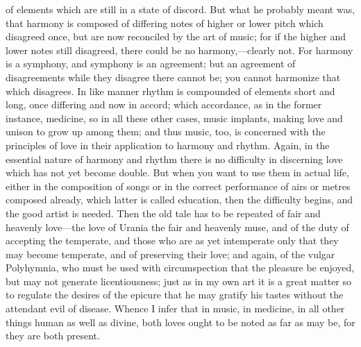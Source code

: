 of elements which are still in a state of discord. But what he probably meant was, that harmony is composed of differing notes of higher or lower pitch which disagreed once, but are now reconciled by the art of music; for if the higher and lower notes still disagreed, there could be no harmony,---clearly not. For harmony is a symphony, and symphony is an agreement; but an agreement of disagreements while they disagree there cannot be; you cannot harmonize that which disagrees. In like manner rhythm is compounded of elements short and long, once differing and now in accord; which accordance, as in the former instance, medicine, so in all these other cases, music implants, making love and unison to grow up among them; and thus music, too, is concerned with the principles of love in their application to harmony and rhythm. Again, in the essential nature of harmony and rhythm there is no difficulty in discerning love which has not yet become double. But when you want to use them in actual life, either in the composition of songs or in the correct performance of airs or metres composed already, which latter is called education, then the difficulty begins, and the good artist is needed. Then the old tale has to be repeated of fair and heavenly love---the love of Urania the fair and heavenly muse, and of the duty of accepting the temperate, and those who are as yet intemperate only that they may become temperate, and of preserving their love; and again, of the vulgar Polyhymnia, who must be used with circumspection that the pleasure be enjoyed, but may not generate licentiousness; just as in my own art it is a great matter so to regulate the desires of the epicure that he may gratify his tastes without the attendant evil of disease. Whence I infer that in music, in medicine, in all other things human as well as divine, both loves ought to be noted as far as may be, for they are both present.

